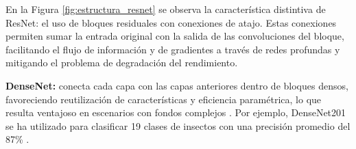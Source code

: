 \vspace{-0.5cm}

En la Figura \ref{fig:estructura_resnet} se observa la característica distintiva de ResNet: el uso de bloques residuales con conexiones de atajo. Estas conexiones permiten sumar la entrada original con la salida de las convoluciones del bloque, facilitando el flujo de información y de gradientes a través de redes profundas y mitigando el problema de degradación del rendimiento.

\par\indent\textbullet\hspace{0.2cm} \textbf{DenseNet:} conecta cada capa con las capas anteriores dentro de bloques densos, favoreciendo reutilización de características y eficiencia paramétrica, lo que resulta ventajoso en escenarios con fondos complejos \parencite{Anumol2023,Zhukov2023}. Por ejemplo, DenseNet201 se ha utilizado para clasificar 19 clases de insectos con una precisión promedio del 87\% \parencite{akter2023insect}. \\

